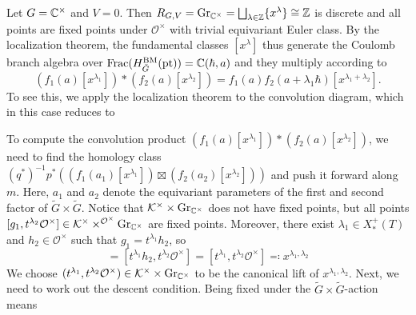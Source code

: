 \begin{example}
	Let $G = \mathbb{C}^\times$ and $V = 0$. Then $R_{G,V} = \textup{Gr}_{\mathbb{C}^\times} = \bigsqcup_{\lambda \in \mathbb{Z}} \{ x^\lambda \} \cong \mathbb{Z}$ is discrete and all points are fixed points under $\mathcal{O}^\times$ with trivial equivariant Euler class. By the localization theorem, the fundamental classes $[x^\lambda]$ thus generate the Coulomb branch algebra over $\operatorname{Frac}(H_{\tilde G}^\textup{BM}(\textup{pt})) = \mathbb{C}(\hbar,a)$ and they multiply according to
	\begin{equation}
		(f_1(a) [x^{\lambda_1}]) * (f_2(a) [x^{\lambda_2}]) = f_1(a) f_2(a+\lambda_1 \hbar) [x^{\lambda_1 + \lambda_2}].
	\end{equation}
	To see this, we apply the localization theorem to the convolution diagram, which in this case reduces to
	\begin{center}
	\end{center}
	To compute the convolution product $(f_1(a) [x^{\lambda_1}]) * (f_2(a) [x^{\lambda_2}])$, we need to find the homology class $(q^*)^{-1} p^*((f_1(a_1) [x^{\lambda_1}]) \boxtimes (f_2(a_2) [x^{\lambda_2}]))$ and push it forward along $m$. Here, $a_1$ and $a_2$ denote the equivariant parameters of the first and second factor of $\tilde G \times \tilde G$. Notice that $\mathcal{K}^\times \times \textup{Gr}_{\mathbb{C}^\times}$ does not have fixed points, but all points $[g_1,t^{\lambda_2} \mathcal{O}^\times] \in \mathcal{K}^\times \times^{\mathcal{O}^\times} \textup{Gr}_{\mathbb{C}^\times}$ are fixed points. Moreover, there exist $\lambda_1 \in X_*^+(T)$ and $h_2 \in \mathcal{O}^\times$ such that $g_1 = t^{\lambda_1} h_2$, so
	\begin{equation}
		[g_1,t^{\lambda_2} \mathcal{O}^\times] = [t^{\lambda_1} h_2,t^{\lambda_2} \mathcal{O}^\times] = [t^{\lambda_1},t^{\lambda_2} \mathcal{O}^\times] \eqcolon x^{\lambda_1,\lambda_2}
	\end{equation}
	We choose $(t^{\lambda_1},t^{\lambda_2} \mathcal{O}^\times) \in \mathcal{K}^\times \times \textup{Gr}_{\mathbb{C}^\times}$ to be the canonical lift of $x^{\lambda_1,\lambda_2}$. Next, we need to work out the descent condition. Being fixed under the $\tilde G \times \tilde G$-action means

\end{example}
